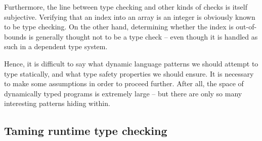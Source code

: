 Furthermore, the line between type checking and other kinds of checks is itself subjective.
Verifying that an index into an array is an integer is obviously known to be type checking.
On the other hand, determining whether the index is out-of-bounds is generally thought not to be a type check -- even though it is handled as such in a dependent type system. 

Hence, it is difficult to say what dynamic language patterns we should attempt to type statically, and what type safety properties we should ensure. It is necessary to make some assumptions in order to proceed further.
After all, the space of dynamically typed programs is extremely large -- but there are only so many interesting patterns hiding within.

\needspace{6em}
\subsection{Taming runtime type checking}
\label{subsec:runtime-type-checking}


